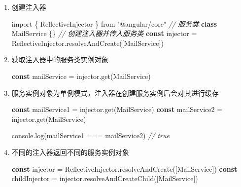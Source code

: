 \documentclass[
]{article}
\newenvironment{Shaded}{}{}
\newcommand{\BuiltInTok}[1]{#1}
\newcommand{\CommentTok}[1]{\textcolor[rgb]{0.38,0.63,0.69}{\textit{#1}}}
\newcommand{\FunctionTok}[1]{\textcolor[rgb]{0.02,0.16,0.49}{#1}}
\newcommand{\ImportTok}[1]{#1}
\newcommand{\KeywordTok}[1]{\textcolor[rgb]{0.00,0.44,0.13}{\textbf{#1}}}
\newcommand{\NormalTok}[1]{#1}
\newcommand{\OperatorTok}[1]{\textcolor[rgb]{0.40,0.40,0.40}{#1}}
\newcommand{\StringTok}[1]{\textcolor[rgb]{0.25,0.44,0.63}{#1}}
\begin{document}
\begin{enumerate}
\def\labelenumi{\arabic{enumi}.}
\item
  创建注入器

\begin{Shaded}
\begin{Highlighting}[]
\ImportTok{import}\NormalTok{ \{ ReflectiveInjector \} }\ImportTok{from} \StringTok{"@angular/core"}
\CommentTok{// 服务类}
\KeywordTok{class}\NormalTok{ MailService \{\}}
\CommentTok{// 创建注入器并传入服务类}
\KeywordTok{const}\NormalTok{ injector }\OperatorTok{=}\NormalTok{ ReflectiveInjector}\OperatorTok{.}\FunctionTok{resolveAndCreate}\NormalTok{([MailService])}
\end{Highlighting}
\end{Shaded}
\item
  获取注入器中的服务类实例对象

\begin{Shaded}
\begin{Highlighting}[]
\KeywordTok{const}\NormalTok{ mailService }\OperatorTok{=}\NormalTok{ injector}\OperatorTok{.}\FunctionTok{get}\NormalTok{(MailService)}
\end{Highlighting}
\end{Shaded}
\item
  服务实例对象为单例模式，注入器在创建服务实例后会对其进行缓存

\begin{Shaded}
\begin{Highlighting}[]
\KeywordTok{const}\NormalTok{ mailService1 }\OperatorTok{=}\NormalTok{ injector}\OperatorTok{.}\FunctionTok{get}\NormalTok{(MailService)}
\KeywordTok{const}\NormalTok{ mailService2 }\OperatorTok{=}\NormalTok{ injector}\OperatorTok{.}\FunctionTok{get}\NormalTok{(MailService)}

\BuiltInTok{console}\OperatorTok{.}\FunctionTok{log}\NormalTok{(mailService1 }\OperatorTok{===}\NormalTok{ mailService2) }\CommentTok{// true}
\end{Highlighting}
\end{Shaded}
\item
  不同的注入器返回不同的服务实例对象

\begin{Shaded}
\begin{Highlighting}[]
\KeywordTok{const}\NormalTok{ injector }\OperatorTok{=}\NormalTok{ ReflectiveInjector}\OperatorTok{.}\FunctionTok{resolveAndCreate}\NormalTok{([MailService])}
\KeywordTok{const}\NormalTok{ childInjector }\OperatorTok{=}\NormalTok{ injector}\OperatorTok{.}\FunctionTok{resolveAndCreateChild}\NormalTok{([MailService])}


\end{Highlighting}
\end{Shaded}
\end{enumerate}
\end{document}
